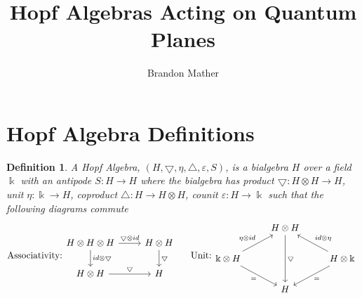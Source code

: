 \documentclass[12pt,a4paper]{article}
\title{Hopf Algebras Acting on Quantum Planes}
\date{}
\author{Brandon Mather}
\newtheorem{definition}[theorem]{Definition}
\newcommand{\kk}{\Bbbk}
\newcommand\1{_{(1)}}
\newcommand\2{_{(2)}}
\begin{document}

\maketitle

\section{Hopf Algebra Definitions}
\begin{definition}
A Hopf Algebra, $\left(H,\bigtriangledown,\eta,\triangle,\varepsilon,S\right)$, is a bialgebra $H$ over a field $\kk$ with an antipode $S:H\to H$ where the bialgebra has product $\bigtriangledown:H\otimes H\to H$, unit $\eta:\kk\to H$, coproduct $\triangle:H\to H\otimes H$, counit $\varepsilon:H\to\kk$ such that the following diagrams commute
\[
\text{Associativity:}
\begin{tikzcd}
H\otimes H\otimes H \arrow[d, "id\otimes \bigtriangledown"] \arrow[r, "\bigtriangledown\otimes id"] & H\otimes H \arrow[d, "\bigtriangledown"] \\
H\otimes H \arrow[r, "\bigtriangledown"]                                                         & H                                    
\end{tikzcd}
\text{   \;\;\;\;Unit:}
\begin{tikzcd}
                                                           & H\otimes H \arrow[dd, "\bigtriangledown"] &                                                           \\
\kk\otimes H \arrow[ru, "\eta\otimes id"] \arrow[rd, "="'] &                                        & H\otimes \kk \arrow[lu, "id\otimes\eta"'] \arrow[ld, "="] \\
                                                           & H                                      &                                                          

\end{tikzcd}\]
\end{definition}
\end{document}
